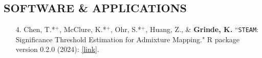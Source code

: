 \documentclass[margin]{res}
\newcommand{\annotateItem}[1]{
	\begin{itemize} \vspace{-0.1cm}
	\item[] 
	\begin{footnotesize}\textcolor{black}{(#1)}\end{footnotesize}
	\end{itemize} \vspace{-0.1cm}
}
\begin{document}
\begin{resume}




\section{SOFTWARE \& APPLICATIONS} 

%

\begin{itemize}
\item[4.] Chen, T.*$^{+}$, McClure, K.*$^{+}$, Ohr, S.*$^{+}$, Huang, Z., \& \textbf{Grinde, K.} 
``\texttt{STEAM}: Significance Threshold Estimation for Admixture Mapping." 
R package version 0.2.0 (2024): \href{https://github.com/GrindeLab/STEAM}{[link]}.
	

\end{itemize}
\end{resume}
\end{document}
